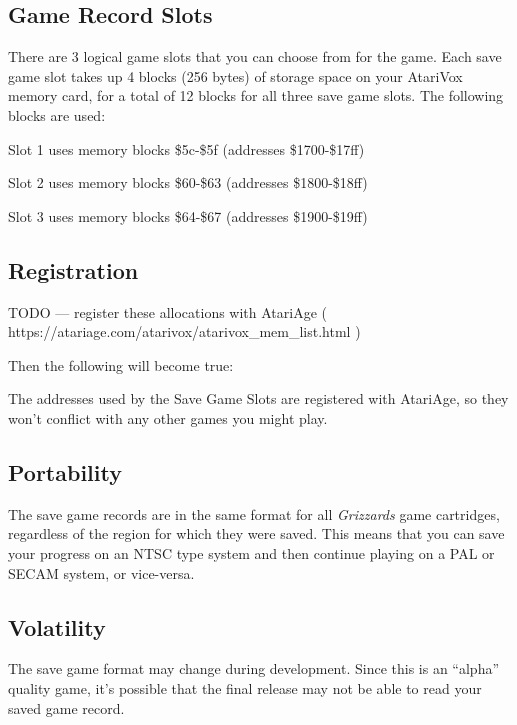 \documentclass[12pt,twoside,openright,book]{memoir}
\begin{document}
\begin{description}
\section{Game Record Slots}

There are 3  logical game slots that  you can choose from  for the game.
Each save game  slot takes up 4  blocks (256 bytes) of  storage space on
your AtariVox memory card,  for a total of 12 blocks  for all three save
game slots. The following blocks are used:

\begin{enumeration}
\item Slot 1 uses memory blocks \$5c-\$5f (addresses \$1700-\$17ff)
\item Slot 2 uses memory blocks \$60-\$63 (addresses \$1800-\$18ff)
\item Slot 3 uses memory blocks \$64-\$67 (addresses \$1900-\$19ff)
\end{enumeration}

\subsection{Registration}

TODO --- register these allocations with AtariAge (
https://atariage.com/atarivox/atarivox\_mem\_list.html )

Then the following will become true:

The addresses used by the Save Game Slots are registered with
AtariAge, so they won't conflict with any other games you might play.

\subsection{Portability}

The save game records are in the same format for all \emph{Grizzards} game
cartridges, regardless of the region for which they were saved.  This means
that you can save your progress on an NTSC type system and then continue
playing on a PAL or SECAM system, or vice-versa.

\subsection{Volatility}

The save game format may change during development. Since this is an
``alpha'' quality game, it's possible that the final release may not
be able to read your saved game record.


\end{description}
\end{document}

